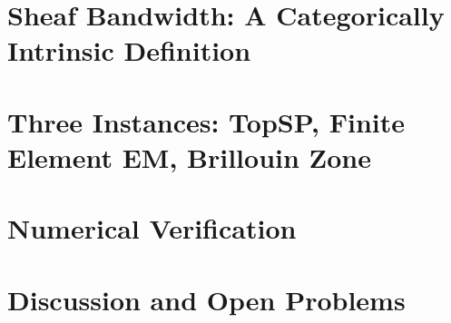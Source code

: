 \documentclass[11pt,reqno]{amsart}
\theoremstyle{plain}
\theoremstyle{definition}
\theoremstyle{definition}
\theoremstyle{definition}
\begin{document}
\section{Sheaf Bandwidth: A Categorically Intrinsic Definition}\label{sec:sheafbw}


\section{Three Instances: TopSP, Finite Element EM, Brillouin Zone}\label{sec:three_instances}


\section{Numerical Verification}\label{sec:numerical}


\section{Discussion and Open Problems}\label{sec:discussion}




\end{document}
